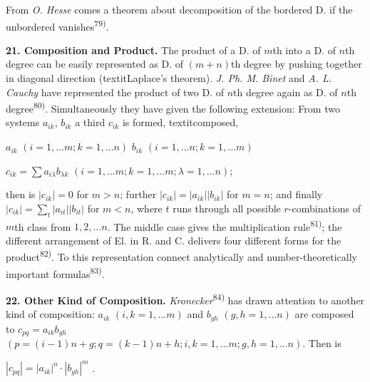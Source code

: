 \thispagestyle{fancy}

\vspace{0.5cm}

From \textit{O. Hesse} comes a theorem about decomposition of the bordered D. if the unbordered vanishes\textsuperscript{79)}.

\vspace{0.2cm}

\textbf{21. Composition and Product.} The product of a D. of $m$th into a D. of $n$th degree can be easily represented as D. of $(m+n)$th degree by pushing together in diagonal direction (textit{Laplace}'s theorem). \textit{J. Ph. M. Binet} and \textit{A. L. Cauchy} have represented the product of two D. of $n$th degree again as D. of $n$th degree\textsuperscript{80)}. Simultaneously they have given the following extension: From two systems $a_{ik}$, $b_{ik}$ a third $c_{ik}$ is formed, textit{composed},

\vspace{-0.1cm}
\begin{center}
    $a_{ik}$ $(i=1,...m; k=1,...n)$
    $b_{ik}$ $(i=1,...n; k=1,...m)$
    
    $c_{ik} = \sum a_{i\lambda}b_{\lambda k}$ $(i=1,...m; k=1,...m; \lambda=1,...n)$;
\end{center}
\vspace{-0.1cm}

then is $|c_{ik}|=0$ for $m>n$; further $|c_{ik}| = |a_{ik}||b_{ik}|$ for $m=n$; and finally $|c_{ik}| = \sum_t |a_{it}||b_{it}|$ for $m<n$, where $t$ runs through all possible $r$-combinations of $m$th class from $1,2,...n$. The middle case gives the multiplication rule\textsuperscript{81)}; the different arrangement of El. in R. and C. delivers four different forms for the product\textsuperscript{82)}. To this representation connect analytically and number-theoretically important formulas\textsuperscript{83)}.

\vspace{0.2cm}

\textbf{22. Other Kind of Composition.} \textit{Kronecker}\textsuperscript{84)} has drawn attention to another kind of composition: $a_{ik}$ $(i,k=1,...m)$ and $b_{gh}$ $(g,h=1,...n)$ are composed to $c_{pq} = a_{ik}b_{gh}$ $(p=(i-1)n+g; q=(k-1)n+h; i,k=1,...m; g,h=1,...n)$. Then is 

\vspace{-0.7cm}
\begin{center}
$|c_{pq}| = |a_{ik}|^n \cdot |b_{gh}|^m$ .
\end{center}
\vspace{-0.1cm}

